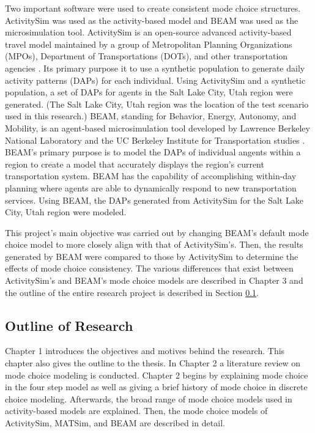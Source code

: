 \documentclass[3p, authoryear, review]{elsarticle} %
\begin{document}
Two important software were used to create consistent mode choice structures. ActivitySim was used as the activity-based model and BEAM was used as the microsimulation tool. ActivitySim is an open-source advanced activity-based travel model maintained by a group of Metropolitan Planning Organizations (MPOs), Department of Transportations (DOTs), and other transportation agencies \citep{asim}. Its primary purpose it to use a synthetic population to generate daily activity patterns (DAPs) for each individual. Using ActivitySim and a synthetic population, a set of DAPs for agents in the Salt Lake City, Utah region were generated. (The Salt Lake City, Utah region was the location of the test scenario used in this research.) BEAM, standing for Behavior, Energy, Autonomy, and Mobility, is an agent-based microsimulation tool developed by Lawrence Berkeley National Laboratory and the UC Berkeley Institute for Transportation studies \citep{beam}. BEAM's primary purpose is to model the DAPs of individual angents within a region to create a model that accurately displays the region's current transportation system. BEAM has the capability of accomplishing within-day planning where agents are able to dynamically respond to new transportation services. Using BEAM, the DAPs generated from ActivitySim for the Salt Lake City, Utah region were modeled.

This project's main objective was carried out by changing BEAM's default mode choice model to more closely align with that of ActivitySim's. Then, the results generated by BEAM were compared to those by ActivitySim to determine the effects of mode choice consistency. The various differences that exist between ActivitySim's and BEAM's mode choice models are described in Chapter 3 and the outline of the entire research project is described in Section \ref{outline}.

\hypertarget{outline}{%
\subsection{Outline of Research}\label{outline}}

Chapter 1 introduces the objectives and motives behind the research. This chapter also gives the outline to the thesis. In Chapter 2 a literature review on mode choice modeling is conducted. Chapter 2 begins by explaining mode choice in the four step model as well as giving a brief history of mode choice in discrete choice modeling. Afterwards, the broad range of mode choice models used in activity-based models are explained. Then, the mode choice models of ActivitySim, MATSim, and BEAM are described in detail.
\end{document}
